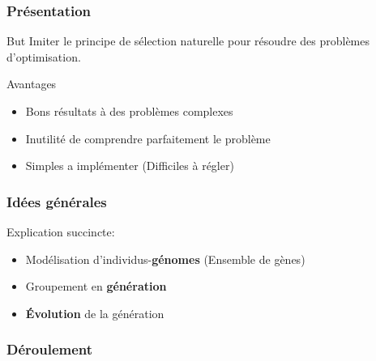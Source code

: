 
\begin{frame}
    \frametitle{Présentation}
    \begin{block}{But}
        \pause
        Imiter le principe de sélection naturelle pour résoudre des problèmes d'optimisation.
    \end{block}
    \pause
    \begin{block}{Avantages}
        \begin{itemize}
            \pause
            \item Bons résultats à des problèmes complexes
            \pause
            \item Inutilité de comprendre parfaitement le problème
            \pause
            \item Simples a implémenter (Difficiles à régler)
        \end{itemize}
    \end{block}
\end{frame}
\begin{frame}
    \frametitle{Idées générales}
    Explication succincte:
    \begin{itemize}
        \pause
        \item Modélisation d'individus-\textbf{génomes} (Ensemble de gènes)
        \pause
        \item Groupement en \textbf{génération}
        \pause
        \item \textbf{Évolution} de la génération
    \end{itemize}
\end{frame}
\begin{frame}
    \frametitle{Déroulement}
    \pause[6]
\end{frame}
